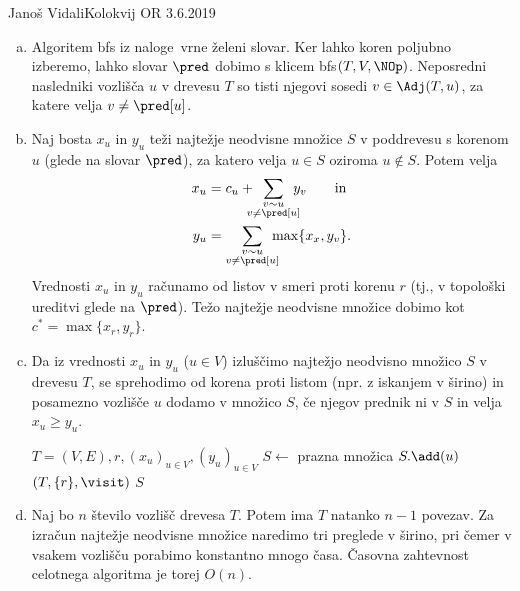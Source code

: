 \begin{naloga}{Janoš Vidali}{Kolokvij OR 3.6.2019}
\begin{odgovor}
\begin{enumerate}[(a)]
\item Algoritem {\sc bfs} iz naloge~\res[bfs] vrne želeni slovar.
Ker lahko koren poljubno izberemo,
lahko slovar $\pred$ dobimo s klicem {\sc bfs}$(T, V, \NOp)$.
Neposredni nasledniki vozlišča $u$ v drevesu $T$
so tisti njegovi sosedi $v \in \Adj(T, u)$,
za katere velja $v \ne \pred[u]$.

\item Naj bosta $x_u$ in $y_u$ teži najtežje neodvisne množice $S$
v poddrevesu s korenom $u$ (glede na slovar $\pred$),
za katero velja $u \in S$ oziroma $u \not\in S$.
Potem velja
\begin{align*}
x_u &= c_u + \!\!\!\!\sum_{\substack{v \sim u \\ v \ne \pred[u]}}\!\!\!\! y_v
\qquad \text{in} \\
y_u &= \sum_{\substack{v \sim u \\ v \ne \pred[u]}}\!\!\!\! \max\{x_x, y_v\} .
\end{align*}
Vrednosti $x_u$ in $y_u$ računamo od listov v smeri proti korenu $r$
(tj., v topološki ureditvi glede na $\pred$).
Težo najtežje neodvisne množice dobimo kot $c^* = \max\{x_r, y_r\}$.

\item Da iz vrednosti $x_u$ in $y_u$ ($u \in V$)
izluščimo najtežjo neodvisno množico $S$ v drevesu $T$,
se sprehodimo od korena proti listom (npr. z iskanjem v širino)
in posamezno vozlišče $u$ dodamo v množico $S$,
če njegov prednik ni v $S$ in velja $x_u \ge y_u$.
\begin{small}
\begin{algorithmic}
%
        {$T = (V, E), r, (x_u)_{u \in V}, (y_u)_{u \in V}$}
    \State $S \gets$ prazna množica
            \State $S.\add(u)$
        \EndIf
    \EndFunction
    $(T, \{r\}, \visit)$
    \State \Return $S$
\EndFunction
\end{algorithmic}
\end{small}

\item Naj bo $n$ število vozlišč drevesa $T$.
Potem ima $T$ natanko $n-1$ povezav.
Za izračun najtežje neodvisne množice naredimo tri preglede v širino,
pri čemer v vsakem vozlišču porabimo konstantno mnogo časa.
Časovna zahtevnost celotnega algoritma je torej $O(n)$.


\end{enumerate}
\end{odgovor}
\end{naloga}
